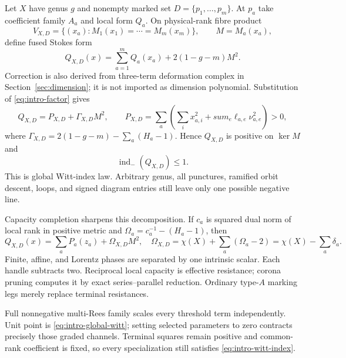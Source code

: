 \documentclass[11pt,a4paper]{amsart}
\theoremstyle{plain}
\theoremstyle{definition}
\newcommand{\indm}{\operatorname{ind}_{-}}
\begin{document}
Let $X$ have genus $g$ and nonempty marked set $D=\{p_1,\ldots,p_m\}$.  At $p_a$ take coefficient
family $A_a$ and local form $Q_a$.  On physical-rank fibre product
\begin{equation}\label{eq:intro-fibre-product}
 V_{X,D}=\{(x_a):M_1(x_1)=\cdots=M_m(x_m)\},\qquad M=M_a(x_a),
\end{equation}
define fused Stokes form
\begin{equation}\label{eq:intro-fusion}
 Q_{X,D}(x)=\sum_{a=1}^{m}Q_a(x_a)+2(1-g-m)M^2.
\end{equation}
Correction is also derived from three-term deformation complex in Section~\ref{sec:dimension}; it
is not imported as dimension polynomial.  Substitution of \eqref{eq:intro-factor} gives
\begin{equation}\label{eq:intro-global-witt}
 Q_{X,D}=P_{X,D}+\Gamma_{X,D}M^2,
 \qquad P_{X,D}=\sum_a\left(\sum_i x_{a,i}^2+sum_e\ell_{a,e}\nu_{a,e}^2\right)>0,
\end{equation}
where $\Gamma_{X,D}=2(1-g-m)-\sum_a(H_a-1)$.  Hence $Q_{X,D}$ is positive on
$\ker M$ and
\begin{equation}\label{eq:intro-witt-index}
                              \indm(Q_{X,D})\le1.
\end{equation}
This is global Witt-index law.  Arbitrary genus, all punctures, ramified orbit descent, loops, and
signed diagram entries still leave only one possible negative line.

Capacity completion sharpens this decomposition.  If $c_a$ is squared dual norm of local rank in
positive metric and $\Omega_a=c_a^{-1}-(H_a-1)$, then
\begin{equation}\label{eq:intro-euler-capacity}
 Q_{X,D}(x)=\sum_aP_a(z_a)+\Omega_{X,D}M^2,
 \quad \Omega_{X,D}=\chi(X)+\sum_a(\Omega_a-2)
 =\chi(X)-\sum_a\delta_a.                                  \tag{EC}
\end{equation}
Finite, affine, and Lorentz phases are separated by one intrinsic scalar.  Each handle subtracts
two.  Reciprocal local capacity is effective resistance; corona pruning computes it by exact
series--parallel reduction.  Ordinary type-$A$ marking legs merely replace terminal resistances.

Full nonnegative multi-Rees family scales every threshold term independently.  Unit point is
\eqref{eq:intro-global-witt}; setting selected parameters to zero contracts precisely those graded
channels.  Terminal squares remain positive and common-rank coefficient is fixed, so every
specialization still satisfies \eqref{eq:intro-witt-index}.
\end{document}
